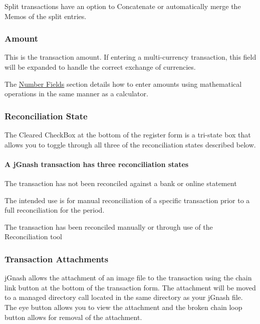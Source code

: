 \documentclass[letterpaper,12pt]{book}
\begin{document}
    Split transactions have an option to Concatenate or automatically merge the Memos of the split entries.

    \subsubsection*{Amount}
    This is the transaction amount. If entering a multi-currency transaction, this field will be expanded to handle
    the correct exchange of currencies.

    The \hyperref[subsec:numberFields]{Number Fields} section details how to enter amounts using mathematical operations
    in the same manner as a calculator.

    \subsubsection*{Reconciliation State}
    The Cleared CheckBox at the bottom of the register form is a tri-state box that allows you to toggle through
    all three of the reconciliation states described below.

    \paragraph*{A jGnash transaction has three reconciliation states}
    \begin{description}[style=nextline]
        \item[Not Reconciled]
        The transaction has not been reconciled against a bank or online statement
        \item[Cleared]
        The intended use is for manual reconciliation of a specific transaction prior to a full reconciliation for the period.
        \item[Reconciled]
        The transaction has been reconciled manually or through use of the Reconciliation tool
    \end{description}

    \subsubsection*{Transaction Attachments}
    jGnash allows the attachment of an image file to the transaction using the chain link button at the bottom of the
    transaction form. The attachment will be moved to a managed directory call  located in the
    same directory as your jGnash file. The eye button allows you to view the attachment and the broken chain loop
    button allows for removal of the attachment.
\end{document}
